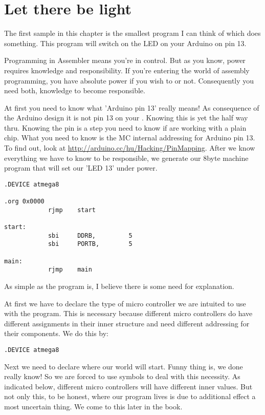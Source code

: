 \section{Let there be light}

The first sample in this chapter is the smallest program I can think of which does something.
This program will switch on the LED on your Arduino on pin 13.

Programming in Assembler means you're in control. But as you know, power requires knowledge and responsibility. If you're entering the world of assembly programming, you have absolute power if you wish to or not. Consequently you need both, knowledge to become responsible.

At first you need to know what 'Arduino pin 13' really means! As consequence of the Arduino design it is not pin 13 on your \at. Knowing this is yet the half way thru. Knowing the pin is a step you need to know if are working with a plain chip. What you need to know is the MC internal addressing for Arduino pin 13. To find out, look at \url{http://arduino.cc/hu/Hacking/PinMapping}. After we know everything we have to know to be responsible, we generate our 8byte machine program that will set our 'LED 13' under power.

\begin{lstlisting}
.DEVICE atmega8

.org 0x0000
            rjmp    start 

start:
            sbi     DDRB,         5
            sbi     PORTB,        5
            
main:
            rjmp    main
\end{lstlisting}

As simple as the program is, I believe there is some need for explanation.

At first we have to declare the type of micro controller we are intuited to use with the program. This is necessary because different micro controllers do have different assignments in their inner structure and need different addressing for their components. We do this by:

\begin{lstlisting}
.DEVICE atmega8
\end{lstlisting}

Next we need to declare where our world will start. Funny thing is, we done really know! So we are forced to use symbols to deal with this necessity. As indicated below, different micro controllers will have different inner values. But not only this, to be honest, where our program lives is due to additional effect a most uncertain thing. We come to this later in the book.

